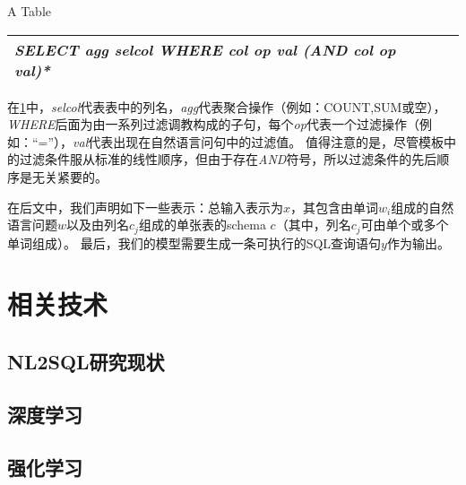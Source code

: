 \begin{table}[!hpb]
    \centering
      {A Table}
    \label{nli:sqlmb}
    \begin{tabular}{@{}llr@{}} \toprule
    \emph{SELECT   agg   selcol   WHERE   col   op   val   (AND   col   op   val)*}\\\bottomrule
  
    \end{tabular}
  \end{table}

  在\ref{nli:sqlmb}中，\emph{selcol}代表表中的列名，\emph{agg}代表聚合操作（例如：COUNT,SUM或空），
  \emph{WHERE}后面为由一系列过滤调教构成的子句，每个\emph{op}代表一个过滤操作（例如：“=”），\emph{val}代表出现在自然语言问句中的过滤值。
  值得注意的是，尽管模板中的过滤条件服从标准的线性顺序，但由于存在\emph{AND}符号，所以过滤条件的先后顺序是无关紧要的。

  在后文中，我们声明如下一些表示：总输入表示为$x$，其包含由单词$w_{i}$组成的自然语言问题$w$以及由列名$c_{j}$组成的单张表的schema $c$（其中，列名$c_{j}$可由单个或多个单词组成）。
  最后，我们的模型需要生成一条可执行的SQL查询语句$y$作为输出。

\section{相关技术}
\subsection{NL2SQL研究现状}
\subsection{深度学习}
\subsection{强化学习}
